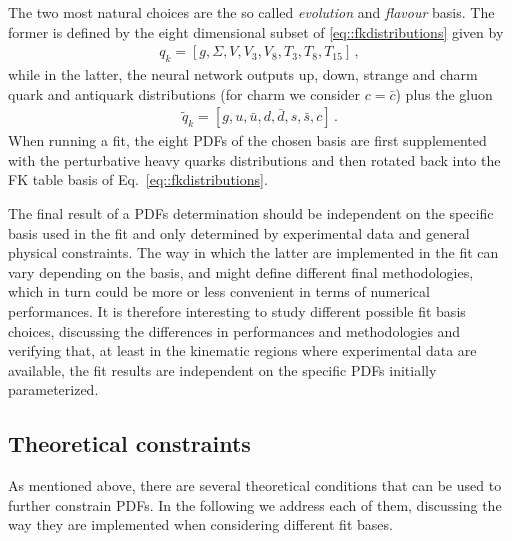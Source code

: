 %
The two most natural choices are the so called \textit{evolution} and \textit{flavour} basis.
The former is defined by the eight dimensional subset of \eqref{eq::fkdistributions} given by 
\begin{align}
    \label{eq:evolution_basis}
    q_k = \left[g, \Sigma, V, V_3, V_8, T_3, T_8, T_{15} \right]\,,
\end{align}
while in the latter, the neural network outputs   
up, down, strange and charm quark and antiquark distributions (for charm we consider $c=\bar{c}$) plus the gluon
\begin{align}
    \label{eq:flavour_basis}
	\tilde{q}_k = \left[g, u, \bar{u}, d, \bar{d}, s, \bar{s}, c\right]\,.
\end{align} 
When running a fit, the eight PDFs of the chosen basis are first supplemented with the perturbative heavy quarks
distributions and then rotated back into the FK table basis of Eq.~\eqref{eq::fkdistributions}.

%
The final result of a PDFs determination should be independent on the specific basis used in the fit
and only determined by experimental data and general physical constraints.
The way in which the latter are implemented in the fit can vary depending on the basis,
and might define different final methodologies, which in turn could be more or less convenient
in terms of numerical performances. It is therefore interesting to study different possible
fit basis choices, discussing the differences in performances and methodologies and verifying that,
at least in the kinematic regions where experimental data are available, the 
fit results are independent on the specific PDFs initially parameterized.


\subsection{Theoretical constraints}
\label{sec:theory_constraints}

As mentioned above, there are several theoretical conditions that can be used to further constrain PDFs.
In the following we address each of them, discussing the way they are implemented when considering
different fit bases.

%
